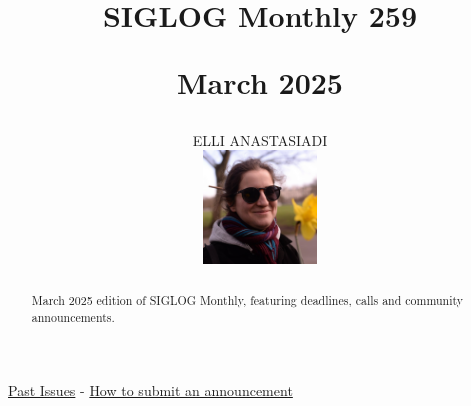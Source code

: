 \documentclass[prodmode,acmtecs]{acmsmall} %
\newcounter{colstart}
\begin{document}
\setcounter{colstart}{\thepage}

\title{{\huge\sc SIGLOG Monthly 259}

 March 2025}\author{ELLI ANASTASIADI\vspace*{-2.6cm}\begin{flushright}\includegraphics[width=30mm]{elli_anastasiadi.png}\end{flushright}}\begin{abstract}March 2025 edition of SIGLOG Monthly, featuring deadlines, calls and community announcements.
\end{abstract}


\maketitlee

\href{https://lics.siglog.org/newsletters/}{Past Issues}
 - 
\href{https://lics.siglog.org/newsletters/inst.html}{How to submit an announcement}
\end{document}
